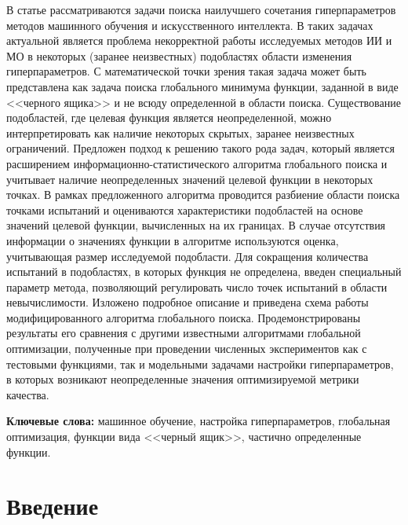 \documentclass[a4paper,12pt,russian]{article}
\begin{document}
\newline
\begin{small}
В статье рассматриваются задачи поиска наилучшего сочетания гиперпараметров методов машинного обучения и искусственного интеллекта. 
В таких задачах актуальной является проблема некорректной работы исследуемых методов ИИ и МО в некоторых (заранее неизвестных) подобластях области изменения гиперпараметров. 
С математической точки зрения такая задача может быть представлена как задача поиска глобального минимума функции, заданной в виде <<черного ящика>> и не всюду определенной в области поиска. 
Существование подобластей, где целевая функция является неопределенной, можно интерпретировать как наличие некоторых скрытых, заранее неизвестных ограничений. Предложен подход к решению такого рода задач, который является расширением информационно-статистического алгоритма глобального поиска и учитывает наличие неопределенных значений целевой функции в некоторых точках. 
В рамках предложенного алгоритма проводится разбиение области поиска точками испытаний и оцениваются характеристики подобластей на основе значений целевой функции, вычисленных на их границах. 
В случае отсутствия информации о значениях функции в алгоритме используются оценка, учитывающая размер исследуемой подобласти. 
Для сокращения количества испытаний в подобластях, в которых функция не определена, введен специальный параметр метода, позволяющий регулировать число точек испытаний в области невычислимости. Изложено подробное описание и приведена схема работы модифицированного алгоритма глобального поиска. Продемонстрированы результаты его сравнения с другими известными алгоритмами глобальной оптимизации, полученные при проведении численных экспериментов как с тестовыми функциями, так и модельными задачами настройки гиперпараметров, в которых возникают неопределенные значения оптимизируемой метрики качества. 


\textbf{Ключевые слова:} машинное обучение, настройка гиперпараметров, глобальная оптимизация, функции вида <<черный ящик>>, частично определенные функции.
\end{small}

\section{Введение}
\end{document}
